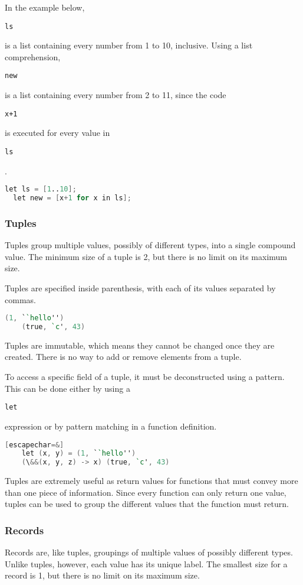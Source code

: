 \documentclass{article}
\def\code#1{\begin{footnotesize}\texttt{#1}\end{footnotesize}}
\begin{document}
In the example below, \code{ls} is a list containing every number from 1 to 10, inclusive.
Using a list comprehension, \code{new} is a list containing every number from 2 to 11, since the code \code{x+1} is executed for every value in \code{ls}.

\begin{lstlisting}[language=V]
  let ls = [1..10];
  let new = [x+1 for x in ls];
\end{lstlisting}



\subsubsection{Tuples}

Tuples group multiple values, possibly of different types, into a single compound value.
The minimum size of a tuple is 2, but there is no limit on its maximum size.

Tuples are specified inside parenthesis, with each of its values separated by commas.

\begin{lstlisting}[language=V]
    (1, ``hello'')
    (true, `c', 43)
\end{lstlisting}

Tuples are immutable, which means they cannot be changed once they are created.
There is no way to add or remove elements from a tuple.

To access a specific field of a tuple, it must be deconstructed using a pattern.
This can be done either by using a \code{let} expression or by pattern matching in a function definition.

\begin{lstlisting}[language=V][escapechar=&]
    let (x, y) = (1, ``hello'')
    (\&&(x, y, z) -> x) (true, `c', 43)
\end{lstlisting}

Tuples are extremely useful as return values for functions that must convey more than one piece of information.
Since every function can only return one value, tuples can be used to group the different values that the function must return.

\subsubsection{Records}

Records are, like tuples, groupings of multiple values of possibly different types.
Unlike tuples, however, each value has its unique label.
The smallest size for a record is 1, but there is no limit on its maximum size.
\end{document}
